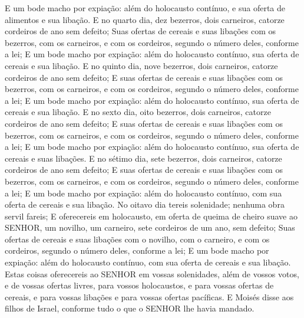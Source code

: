 {{  E um bode macho por expiação: além do holocausto contínuo, e sua oferta de alimentos e sua libação.
  E no quarto dia, dez bezerros, dois carneiros, catorze cordeiros de ano sem defeito;
  Suas ofertas de cereais e suas libações com os bezerros, com os carneiros, e com os cordeiros, segundo o número deles, conforme a lei;
  E um bode macho por expiação: além do holocausto contínuo, sua oferta de cereais e sua libação.
  E no quinto dia, nove bezerros, dois carneiros, catorze cordeiros de ano sem defeito;
  E suas ofertas de cereais e suas libações com os bezerros, com os carneiros, e com os cordeiros, segundo o número deles, conforme a lei;
  E um bode macho por expiação: além do holocausto contínuo, sua oferta de cereais e sua libação.
  E no sexto dia, oito bezerros, dois carneiros, catorze cordeiros de ano sem defeito;
  E suas ofertas de cereais e suas libações com os bezerros, com os carneiros, e com os cordeiros, segundo o número deles, conforme a lei;
  E um bode macho por expiação: além do holocausto contínuo, sua oferta de cereais e suas libações.
  E no sétimo dia, sete bezerros, dois carneiros, catorze cordeiros de ano sem defeito;
  E suas ofertas de cereais e suas libações com os bezerros, com os carneiros, e com os cordeiros, segundo o número deles, conforme a lei;
  E um bode macho por expiação: além do holocausto contínuo, com sua oferta de cereais e sua libação.
  No oitavo dia tereis solenidade; nenhuma obra servil fareis;
  E oferecereis em holocausto, em oferta de queima de cheiro suave ao SENHOR, um novilho, um carneiro, sete cordeiros de um ano, sem defeito;
  Suas ofertas de cereais e suas libações com o novilho, com o carneiro, e com os cordeiros, segundo o número deles, conforme a lei;
  E um bode macho por expiação: além do holocausto contínuo, com sua oferta de cereais e sua libação.
  Estas coisas oferecereis ao SENHOR em vossas solenidades, além de vossos votos, e de vossas ofertas livres, para vossos holocaustos, e para vossas ofertas de cereais, e para vossas libações e para vossas ofertas pacíficas}.
  E Moisés disse aos filhos de Israel, conforme tudo o que o SENHOR lhe havia mandado.
\par }

